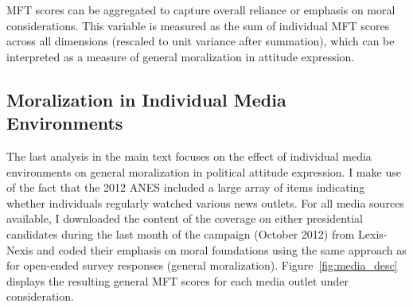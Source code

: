 \documentclass[12pt]{article}
\begin{document}
MFT scores can be aggregated to capture overall reliance or emphasis on moral considerations. This variable is measured as the sum of individual MFT scores across all dimensions (rescaled to unit variance after summation), which can be interpreted as a measure of general moralization in attitude expression.


\clearpage
\subsection{Moralization in Individual Media Environments}

The last analysis in the main text focuses on the effect of individual media environments on general moralization in political attitude expression. I make use of the fact that the 2012 ANES included a large array of items indicating whether individuals regularly watched various news outlets. For all media sources available, I downloaded the content of the coverage on either presidential candidates during the last month of the campaign (October 2012) from Lexis-Nexis and coded their emphasis on moral foundations using the same approach as for open-ended survey responses (general moralization). Figure~\ref{fig:media_desc} displays the resulting general MFT scores for each media outlet under consideration.
\end{document}
